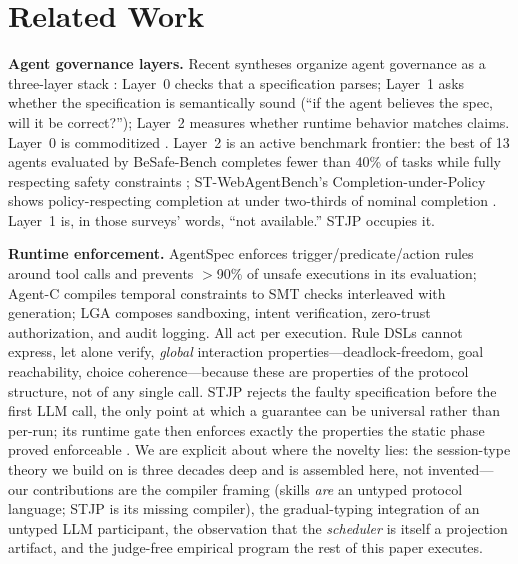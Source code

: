 \documentclass{article}
\newcommand{\stjp}{\textsc{STJP}}
\begin{document}
\section{Related Work}\label{sec:related}
\textbf{Agent governance layers.} Recent syntheses organize agent governance as a three-layer stack \citep{governspec,lga}: Layer~0 checks that a specification parses; Layer~1 asks whether the specification is semantically sound (``if the agent believes the spec, will it be correct?''); Layer~2 measures whether runtime behavior matches claims. Layer~0 is commoditized \citep{skilldex}. Layer~2 is an active benchmark frontier: the best of 13 agents evaluated by BeSafe-Bench completes fewer than 40\% of tasks while fully respecting safety constraints \citep{besafe}; ST-WebAgentBench's Completion-under-Policy shows policy-respecting completion at under two-thirds of nominal completion \citep{stweb}. Layer~1 is, in those surveys' words, ``not available.'' \stjp{} occupies it.

\textbf{Runtime enforcement.} AgentSpec \citep{agentspec} enforces trigger/predicate/action rules around tool calls and prevents $>$90\% of unsafe executions in its evaluation; Agent-C \citep{agentc} compiles temporal constraints to SMT checks interleaved with generation; LGA \citep{lga} composes sandboxing, intent verification, zero-trust authorization, and audit logging. All act per execution. Rule DSLs cannot express, let alone verify, \emph{global} interaction properties---deadlock-freedom, goal reachability, choice coherence---because these are properties of the protocol structure, not of any single call. \stjp{} rejects the faulty specification before the first LLM call, the only point at which a guarantee can be universal rather than per-run; its runtime gate then enforces exactly the properties the static phase proved enforceable \citep{bocchi13}. We are explicit about where the novelty lies: the session-type theory we build on is three decades deep and is assembled here, not invented---our contributions are the compiler framing (skills \emph{are} an untyped protocol language; \stjp{} is its missing compiler), the gradual-typing integration of an untyped LLM participant, the observation that the \emph{scheduler} is itself a projection artifact, and the judge-free empirical program the rest of this paper executes.
\end{document}
